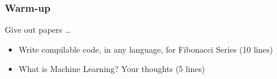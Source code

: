 

\begin{frame}[fragile]\frametitle{Warm-up}
Give out papers \ldots

\begin{itemize}
\item Write compilable code, in any language, for Fibonacci Series (10 lines)
\item What is Machine Learning? Your thoughts (5 lines)
\end{itemize}
\end{frame}
